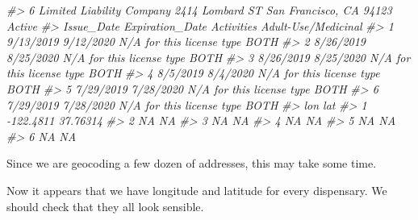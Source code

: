 \documentclass[
  12pt,
]{book}
\newenvironment{Shaded}{\begin{snugshade}}{\end{snugshade}}
\newcommand{\CommentTok}[1]{\textcolor[rgb]{0.37,0.37,0.37}{\textit{#1}}}
\newcommand{\ControlFlowTok}[1]{\textcolor[rgb]{0.27,0.27,0.27}{\textbf{#1}}}
\newcommand{\DecValTok}[1]{\textcolor[rgb]{0.06,0.06,0.06}{#1}}
\newcommand{\KeywordTok}[1]{\textcolor[rgb]{0.27,0.27,0.27}{\textbf{#1}}}
\newcommand{\NormalTok}[1]{#1}
\newcommand{\OperatorTok}[1]{\textcolor[rgb]{0.43,0.43,0.43}{\textbf{#1}}}
\newcommand{\StringTok}[1]{\textcolor[rgb]{0.5,0.5,0.5}{#1}}
\begin{document}
\begin{Shaded}
\begin{Highlighting}[]
\CommentTok{\#\textgreater{} 6 Limited Liability Company 2414 Lombard ST San Francisco, CA 94123 Active}
\CommentTok{\#\textgreater{}   Issue\_Date Expiration\_Date                Activities Adult{-}Use/Medicinal}
\CommentTok{\#\textgreater{} 1  9/13/2019       9/12/2020 N/A for this license type                BOTH}
\CommentTok{\#\textgreater{} 2  8/26/2019       8/25/2020 N/A for this license type                BOTH}
\CommentTok{\#\textgreater{} 3  8/26/2019       8/25/2020 N/A for this license type                BOTH}
\CommentTok{\#\textgreater{} 4   8/5/2019        8/4/2020 N/A for this license type                BOTH}
\CommentTok{\#\textgreater{} 5  7/29/2019       7/28/2020 N/A for this license type                BOTH}
\CommentTok{\#\textgreater{} 6  7/29/2019       7/28/2020 N/A for this license type                BOTH}
\CommentTok{\#\textgreater{}         lon      lat}
\CommentTok{\#\textgreater{} 1 {-}122.4811 37.76314}
\CommentTok{\#\textgreater{} 2        NA       NA}
\CommentTok{\#\textgreater{} 3        NA       NA}
\CommentTok{\#\textgreater{} 4        NA       NA}
\CommentTok{\#\textgreater{} 5        NA       NA}
\CommentTok{\#\textgreater{} 6        NA       NA}
\end{Highlighting}
\end{Shaded}

Since we are geocoding a few dozen of addresses, this may take some time.

\begin{Shaded}
\end{Shaded}

Now it appears that we have longitude and latitude for every dispensary. We should check that they all look sensible.

\begin{Shaded}
\end{Shaded}
\end{document}
